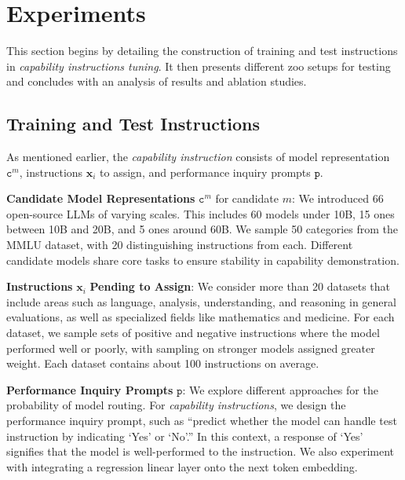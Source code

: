 \section{Experiments}
\label{sec:experiments}

This section begins by detailing the construction of training and test instructions in \textit{capability instructions tuning}. It then presents different zoo setups for testing and concludes with an analysis of results and ablation studies.


\subsection{Training and Test Instructions}

As mentioned earlier, the \textit{capability instruction} consists of model representation $\texttt{c}^m$, instructions $\mathbf{x}_i$ to assign, and performance inquiry prompts $\texttt{p}$.

\textbf{Candidate Model Representations} $\texttt{c}^m$ for candidate $m$: We introduced 66 open-source LLMs of varying scales. This includes 60 models under 10B, 15 ones between 10B and 20B, and 5 ones around 60B.
We sample 50 categories from the MMLU dataset, with 20 distinguishing instructions from each. Different candidate models share core tasks to ensure stability in capability demonstration.

\textbf{Instructions} $\mathbf{x}_i$ \textbf{Pending to Assign}: We consider more than 20 datasets that include areas such as language, analysis, understanding, and reasoning in general evaluations, as well as specialized fields like mathematics and medicine. For each dataset, we sample sets of positive and negative instructions where the model performed well or poorly, with sampling on stronger models assigned greater weight. Each dataset contains about 100 instructions on average.





\textbf{Performance Inquiry Prompts} $\texttt{p}$: We explore different approaches for the probability of model routing. For \textit{capability instructions}, we design the performance inquiry prompt, such as ``predict whether the model can handle test instruction by indicating `Yes' or `No'.'' In this context, a response of `Yes' signifies that the model is well-performed to the instruction. We also experiment with integrating a regression linear layer onto the next token embedding.

